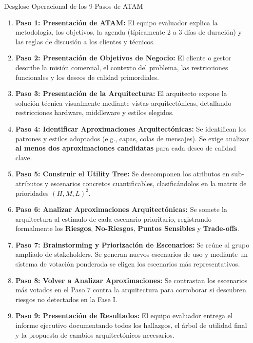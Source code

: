 \begin{definicion}{Desglose Operacional de los 9 Pasos de ATAM}
\begin{enumerate}[leftmargin=1.5em]
  \item \textbf{Paso 1: Presentación de ATAM:} El equipo evaluador explica la metodología, los objetivos, la agenda (típicamente 2 a 3 días de duración) y las reglas de discusión a los clientes y técnicos.
  \item \textbf{Paso 2: Presentación de Objetivos de Negocio:} El cliente o gestor describe la misión comercial, el contexto del problema, las restricciones funcionales y los deseos de calidad primordiales.
  \item \textbf{Paso 3: Presentación de la Arquitectura:} El arquitecto expone la solución técnica visualmente mediante vistas arquitectónicas, detallando restricciones hardware, middleware y estilos elegidos.
  \item \textbf{Paso 4: Identificar Aproximaciones Arquitectónicas:} Se identifican los patrones y estilos adoptados (e.g., capas, colas de mensajes). Se exige analizar \textbf{al menos dos aproximaciones candidatas} para cada deseo de calidad clave.
  \item \textbf{Paso 5: Construir el Utility Tree:} Se descomponen los atributos en sub-atributos y escenarios concretos cuantificables, clasificándolos en la matriz de prioridades $(H, M, L)^2$.
  \item \textbf{Paso 6: Analizar Aproximaciones Arquitectónicas:} Se somete la arquitectura al estímulo de cada escenario prioritario, registrando formalmente los \textbf{Riesgos}, \textbf{No-Riesgos}, \textbf{Puntos Sensibles} y \textbf{Trade-offs}.
  \item \textbf{Paso 7: Brainstorming y Priorización de Escenarios:} Se reúne al grupo ampliado de stakeholders. Se generan nuevos escenarios de uso y mediante un sistema de votación ponderada se eligen los escenarios más representativos.
  \item \textbf{Paso 8: Volver a Analizar Aproximaciones:} Se contrastan los escenarios más votados en el Paso 7 contra la arquitectura para corroborar si descubren riesgos no detectados en la Fase I.
  \item \textbf{Paso 9: Presentación de Resultados:} El equipo evaluador entrega el informe ejecutivo documentando todos los hallazgos, el árbol de utilidad final y la propuesta de cambios arquitectónicos necesarios.
\end{enumerate}
\end{definicion}

